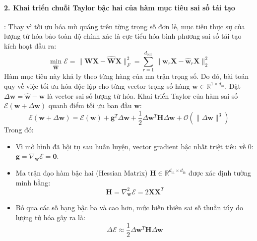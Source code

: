 \paragraph{2. Khai triển chuỗi Taylor bậc hai của hàm mục tiêu sai số tái tạo}:
Thay vì tối ưu hóa mù quáng trên từng trọng số đơn lẻ, mục tiêu thực sự của lượng tử hóa bảo toàn độ chính xác là cực tiểu hóa bình phương sai số tái tạo kích hoạt đầu ra:
\begin{equation}
\min_{\widehat{\mathbf{W}}} \mathcal{E} = \|\mathbf{W} \mathbf{X} - \widehat{\mathbf{W}} \mathbf{X}\|_F^2 = \sum_{r=1}^{d_{\text{out}}} \|\mathbf{w}_r \mathbf{X} - \widehat{\mathbf{w}}_r \mathbf{X}\|_2^2
\end{equation}
Hàm mục tiêu này khả ly theo từng hàng của ma trận trọng số. Do đó, bài toán quy về việc tối ưu hóa độc lập cho từng vector trọng số hàng $\mathbf{w} \in \mathbb{R}^{1 \times d_{\text{in}}}$. Đặt $\Delta \mathbf{w} = \widehat{\mathbf{w}} - \mathbf{w}$ là vector sai số lượng tử hóa. Khai triển Taylor của hàm sai số $\mathcal{E}(\mathbf{w} + \Delta \mathbf{w})$ quanh điểm tối ưu ban đầu $\mathbf{w}$:
\begin{equation}
\mathcal{E}(\mathbf{w} + \Delta \mathbf{w}) = \mathcal{E}(\mathbf{w}) + \mathbf{g}^T \Delta \mathbf{w} + \frac{1}{2} \Delta \mathbf{w}^T \mathbf{H} \Delta \mathbf{w} + \mathcal{O}(\|\Delta \mathbf{w}\|^3)
\end{equation}
Trong đó:
\begin{itemize}
  \item Vì mô hình đã hội tụ sau huấn luyện, vector gradient bậc nhất triệt tiêu về 0: $\mathbf{g} = \nabla_{\mathbf{w}} \mathcal{E} = \mathbf{0}$.
  \item Ma trận đạo hàm bậc hai (Hessian Matrix) $\mathbf{H} \in \mathbb{R}^{d_{\text{in}} \times d_{\text{in}}}$ được xác định tường minh bằng:
  \begin{equation}
  \mathbf{H} = \nabla^2_{\mathbf{w}} \mathcal{E} = 2 \mathbf{X} \mathbf{X}^T
  \end{equation}
  \item Bỏ qua các số hạng bậc ba và cao hơn, mức biến thiên sai số thuần túy do lượng tử hóa gây ra là:
  \begin{equation}
  \Delta \mathcal{E} \approx \frac{1}{2} \Delta \mathbf{w}^T \mathbf{H} \Delta \mathbf{w}
  \end{equation}
\end{itemize}

